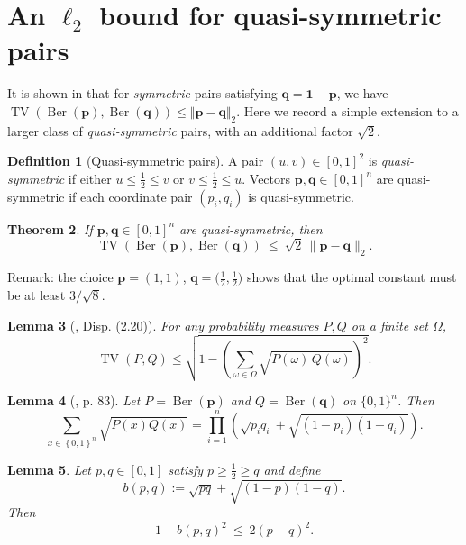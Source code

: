 \documentclass[11pt]{amsart}
\numberwithin{equation}{section}
\newtheorem{theorem}{Theorem}[section]
\newtheorem{lemma}[theorem]{Lemma}
\theoremstyle{definition}
\newtheorem{definition}[theorem]{Definition}
\newcommand{\TV}{\operatorname{TV}}
\newcommand{\Ber}{\operatorname{Ber}}
\newcommand{\norm}[1]{\Vert #1 \Vert}
\newcommand{\set}[1]{\left\{ #1 \right\}}
\newcommand{\vct}[1]{\mathbf{#1}}
\newcommand{\onevec}{\mathbf{1}}
\newcommand{\pvec}{\vct{p}}
\newcommand{\qvec}{\vct{q}}
\begin{document}
\appendix

\section{An $\ell_2$ bound for quasi-symmetric pairs}
\label{sec:appendix_quasisym}

It is shown in
\cite[Theorem 1.2]{kon25tens} that
for \emph{symmetric} pairs satisfying $\qvec=\onevec-\pvec$,
we have
$\TV(\Ber(\pvec),\Ber(\qvec))\le\norm{\pvec-\qvec}_2$.
Here we record a simple extension to a larger class of \emph{quasi-symmetric} pairs, with an additional factor $\sqrt{2}$.

\begin{definition}[Quasi-symmetric pairs]
A pair $(u,v)\in[0,1]^2$ is \emph{quasi-symmetric} if either $u\le \tfrac12\le v$ or $v\le \tfrac12\le u$.
Vectors $\pvec,\qvec\in[0,1]^n$ are quasi-symmetric if each coordinate pair $(p_i,q_i)$ is quasi-symmetric.
\end{definition}

\begin{theorem}\label{thm:sqrt2}
If $\pvec,\qvec\in[0,1]^n$ are quasi-symmetric, then
\[
\TV(\Ber(\pvec),\Ber(\qvec))\ \le\ \sqrt{2}\,\|\pvec-\qvec\|_2.
\]
\end{theorem}
\noindent
Remark: the choice
$\pvec=(1,1)$,
$\qvec=\bigl(\tfrac12,\tfrac12\bigr)$ shows that the optimal
constant must be at least $3/\sqrt{8}$.


\begin{lemma}[\cite{tsybakov09}, Disp. (2.20)]
\label{lem:tv-bc}
For any probability measures $P,Q$ on a finite set $\Omega$,
\[
\TV(P,Q) \le 
\sqrt{1-\left(\sum_{\omega\in\Omega}\sqrt{P(\omega)\,Q(\omega)}\right)^2}.
\]
\end{lemma}

\begin{lemma}[\cite{tsybakov09}, p. 83]
\label{lem:bc-tensor}
Let $P=\Ber(\pvec)$ and $Q=\Ber(\qvec)$ on $\{0,1\}^n$. Then
\[
\sum_{x\in\set{0,1}^n}\sqrt{P(x)Q(x)}
=\prod_{i=1}^n\left(\sqrt{p_iq_i}+\sqrt{(1-p_i)(1-q_i)}\right).
\]
\end{lemma}

\begin{lemma}
\label{lem:1d}
Let $p,q\in[0,1]$ satisfy $p\ge \tfrac12\ge q$ and define
\[
b(p,q):=\sqrt{pq}+\sqrt{(1-p)(1-q)}.
\]
Then
\[
1-b(p,q)^2\ \le\ 2(p-q)^2.
\]
\end{lemma}
\end{document}
